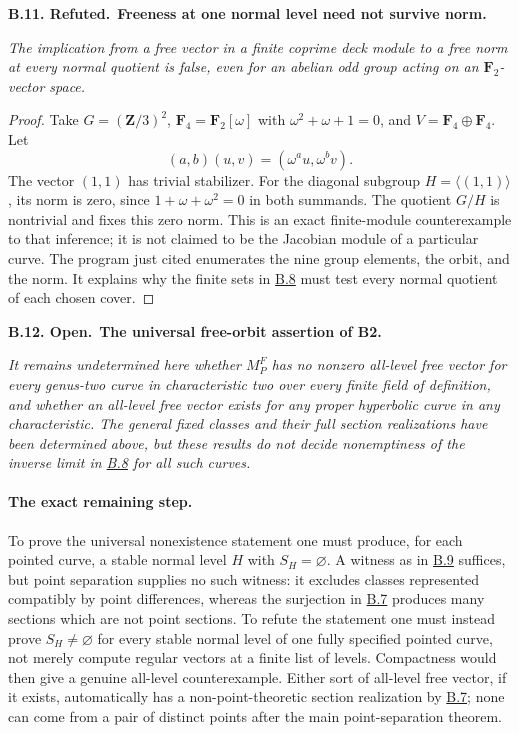 \documentclass[11pt,a4paper]{article}
\newcommand{\Z}{\mathbf Z}
\newcommand{\F}{\mathbf F}
\newenvironment{claim}[3]{\par\medskip\noindent\hypertarget{#1}{\textbf{#1. #2.}}\ \textbf{#3.}\par\nopagebreak\smallskip\begingroup\itshape}{\endgroup\par\smallskip}
\newcommand{\statementref}[1]{\hyperlink{#1}{#1}}
\begin{document}
\begin{claim}{B.11}{Refuted}{Freeness at one normal level need not survive norm}
The implication from a free vector in a finite coprime deck module
to a free norm at every normal quotient is false, even for an
abelian odd group acting on an $\F_2$-vector space.
\end{claim}
\begin{proof}
Take $G=(\Z/3)^2$, $\F_4=\F_2[\omega]$ with
$\omega^2+\omega+1=0$, and $V=\F_4\oplus\F_4$. Let
\[
          (a,b)(u,v)=(\omega^a u,\omega^b v).
\]
The vector $(1,1)$ has trivial stabilizer. For the diagonal
subgroup $H=\langle(1,1)\rangle$, its norm is zero, since
$1+\omega+\omega^2=0$ in both summands. The quotient $G/H$ is
nontrivial and fixes this zero norm. This is an exact finite-module
counterexample to that inference; it is not claimed to be the
Jacobian module of a particular curve. The program just cited
enumerates the nine group elements, the orbit, and the norm.
It explains why the finite sets in \statementref{B.8} must test
every normal quotient of each chosen cover.
\end{proof}

\begin{claim}{B.12}{Open}{The universal free-orbit assertion of B2}
It remains undetermined here whether $M_P^F$ has no nonzero
all-level free vector for every genus-two curve in characteristic
two over every finite field of definition, and whether an
all-level free vector exists for any proper hyperbolic curve in
any characteristic. The general fixed classes and their full
section realizations have been determined above, but these results
do not decide nonemptiness of the inverse limit in
\statementref{B.8} for all such curves.
\end{claim}
\paragraph{The exact remaining step.}
To prove the universal nonexistence statement one must produce,
for each pointed curve, a stable normal level $H$ with
$S_H=\varnothing$. A witness as in \statementref{B.9} suffices,
but point separation supplies no such witness: it excludes classes
represented compatibly by point differences, whereas the
surjection in \statementref{B.7} produces many sections which
are not point sections. To refute the statement one must instead
prove $S_H\ne\varnothing$ for every stable normal level of one
fully specified pointed curve, not merely compute regular vectors
at a finite list of levels. Compactness would then give a genuine
all-level counterexample. Either sort of all-level free vector,
if it exists, automatically has a non-point-theoretic section
realization by \statementref{B.7}; none can come from a pair of
distinct points after the main point-separation theorem.
\end{document}

